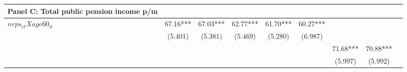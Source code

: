{\begin{tabular}{l*{8}{c}}
    \midrule
    Panel C: Total public pension income p/m 
    & \multicolumn{1}{c}{} & \multicolumn{1}{c}{} & \multicolumn{1}{c}{} & \multicolumn{1}{c}{} & \multicolumn{1}{c}{}&\multicolumn{1}{c}{}&\multicolumn{1}{c}{}%
    \\
    \midrule
$nrps_{ct}Xage60_{it}$ 
&       67.16***&       67.03***&       62.77***&       61.70***&       60.27***&               &               \\
&     (5.401)   &     (5.381)   &     (5.469)   &     (5.280)   &     (6.987)   &               &               \\
[1em]
&               &               &               &               &               &       71.68***&       70.88***\\
                    &               &               &               &               &               &     (5.997)   &     (5.992)   \\





\end{tabular}}
